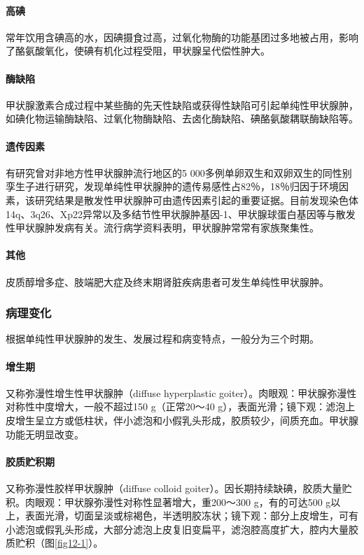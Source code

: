\paragraph{高碘}
常年饮用含碘高的水，因碘摄食过高，过氧化物酶的功能基团过多地被占用，影响了酪氨酸氧化，使碘有机化过程受阻，甲状腺呈代偿性肿大。

\paragraph{酶缺陷}
甲状腺激素合成过程中某些酶的先天性缺陷或获得性缺陷可引起单纯性甲状腺肿，如碘化物运输酶缺陷、过氧化物酶缺陷、去卤化酶缺陷、碘酪氨酸耦联酶缺陷等。

\paragraph{遗传因素}
有研究曾对非地方性甲状腺肿流行地区的5
000多例单卵双生和双卵双生的同性别孪生子进行研究，发现单纯性甲状腺肿的遗传易感性占82％，18％归因于环境因素，该研究结果是散发性甲状腺肿可由遗传因素引起的重要证据。目前发现染色体14q、3q26、Xp22异常以及多结节性甲状腺肿基因-1、甲状腺球蛋白基因等与散发性甲状腺肿发病有关。流行病学资料表明，甲状腺肿常常有家族聚集性。

\paragraph{其他}
皮质醇增多症、肢端肥大症及终末期肾脏疾病患者可发生单纯性甲状腺肿。

\subsubsection{病理变化}

根据单纯性甲状腺肿的发生、发展过程和病变特点，一般分为三个时期。

\paragraph{增生期}
又称弥漫性增生性甲状腺肿（diffuse hyperplastic
goiter）。肉眼观：甲状腺弥漫性对称性中度增大，一般不超过150
g（正常20～40
g），表面光滑；镜下观：滤泡上皮增生呈立方或低柱状，伴小滤泡和小假乳头形成，胶质较少，间质充血。甲状腺功能无明显改变。

\paragraph{胶质贮积期}
又称弥漫性胶样甲状腺肿（diffuse colloid
goiter）。因长期持续缺碘，胶质大量贮积。肉眼观：甲状腺弥漫性对称性显著增大，重200～300
g，有的可达500
g以上，表面光滑，切面呈淡或棕褐色，半透明胶冻状；镜下观：部分上皮增生，可有小滤泡或假乳头形成，大部分滤泡上皮复旧变扁平，滤泡腔高度扩大，腔内大量胶质贮积（图\ref{fig12-1}）。

